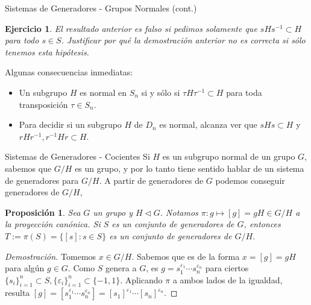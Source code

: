 \documentclass{beamer}
\newtheorem{ejercicio}[teorema]{Ejercicio}
\newtheorem{proposicion}[teorema]{Proposici\'on}
\begin{document}
\begin{frame}{Sistemas de Generadores - Grupos Normales (cont.)}
\begin{ejercicio} El resultado anterior es falso si pedimos solamente que $sHs^{-1} \subset H$ para todo $s \in S$. Justificar por qué la demostración anterior no es correcta si sólo tenemos esta hipótesis.
\end{ejercicio}
Algunas consecuencias inmediatas:
\begin{itemize}
\item Un subgrupo $H$ es normal en $S_n$ si y sólo si $\tau H \tau^{-1} \subset H$ para toda \alert{transposición} $\tau \in S_n$.
 \item Para decidir si un subgrupo $H$ de $D_n$ es normal, alcanza ver que $sHs \subset H$ y $rHr^{-1}, r^{-1}Hr \subset H$.
\end{itemize}
\end{frame}
  
\begin{frame}{Sistemas de Generadores - Cocientes}
Si $H$ es un subgrupo normal de un grupo $G$, sabemos que $G/H$ es un grupo, y por lo tanto tiene sentido hablar de un sistema de generadores para $G/H$.  A partir de generadores de $G$ podemos conseguir generadores de $G/H$,

\begin{proposicion} Sea $G$ un grupo y $H \triangleleft G$. Notamos $\pi : g \mapsto [g] = gH \in G/H$ a la proyección canónica. Si $S$ es un conjunto de generadores de $G$, entonces $T := \pi(S) = \{[s] : s \in S\}$ es un conjunto de generadores de $G/H$.
\end{proposicion}
\begin{proof}[Demostración] Tomemos $x \in G/H$. Sabemos que es de la forma $x= [g] = gH$ para algún $g \in G$. Como $S$ genera a $G$, es $g = s_1^{\varepsilon_1} \cdots s_n^{\varepsilon_n}$ para ciertos $\{s_i\}_{i=1}^n \subset S, \{\varepsilon_i\}_{i=1}^n \subset \{-1,1\}$.  Aplicando $\pi$ a ambos lados de la igualdad, resulta $[g] = [s_1^{\varepsilon_1} \cdots s_n^{\varepsilon_n}] = [s_1]^{\varepsilon_1} \cdots [s_n]^{\varepsilon_n}$.
\end{proof}
\end{frame}
\end{document}
